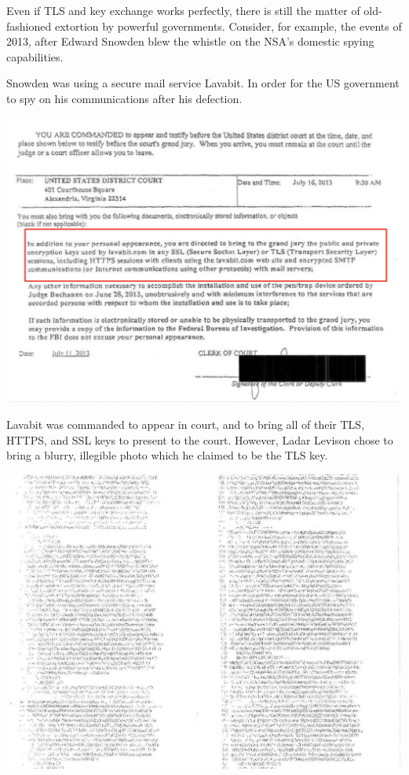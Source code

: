 \documentclass[11pt]{article} %
\begin{document}
{Even if TLS and key exchange works perfectly, there is still the matter of old-fashioned extortion by powerful governments. Consider, for example, the events of 2013, after Edward Snowden blew the whistle on the NSA's domestic spying capabilities.

Snowden was using a secure mail service Lavabit. In order for the US government to spy on his communications after his defection.

\includegraphics[scale=.3]{./lavabit-summons.png}

Lavabit was commanded to appear in court, and to bring all of their TLS, HTTPS, and SSL keys to present to the court. However, Ladar Levison chose to bring a blurry, illegible photo which he claimed to be the TLS key.

\includegraphics[scale=.3]{./lavabit-blurry-key.png}

}
\end{document}
